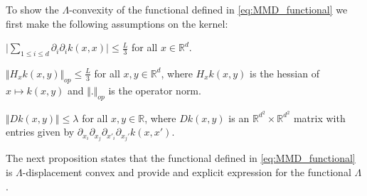 To show the $\Lambda$-convexity of the functional defined in \cref{eq:MMD_functional} we first make the following assumptions on the kernel:
\begin{assumplist} 
\item \label{assump:bounded_trace} $ \vert \sum_{1\leq i\leq d} \partial_i\partial_ik(x,x) \vert\leq \frac{L}{3}  $ for all $x\in \mathbb{R}^d$.
\item \label{assump:bounded_hessian} $\Vert H_xk(x,y) \Vert_{op} \leq \frac{L}{3}$ for all $x,y\in \mathbb{R}^d$, where $H_xk(x,y)$ is the hessian of $x\mapsto k(x,y)$ and $\Vert.\Vert_{op}$ is the operator norm.
\item \label{assump:bounded_fourth_oder} $\Vert Dk(x,y) \Vert\leq \lambda  $ for all $x,y\in \mathbb{R}$, where $Dk(x,y)$ is an $\mathbb{R}^{d^2}\times \mathbb{R}^{d^2}$ matrix with entries given by $\partial_{x_{i}}\partial_{x_{j}}\partial_{x'_{i}}\partial_{x_{j}'}k(x,x')$.
\end{assumplist}
The next proposition states that the functional defined in \cref{eq:MMD_functional} is $\Lambda$-displacement convex and provide and explicit expression for the functional $\Lambda$.

